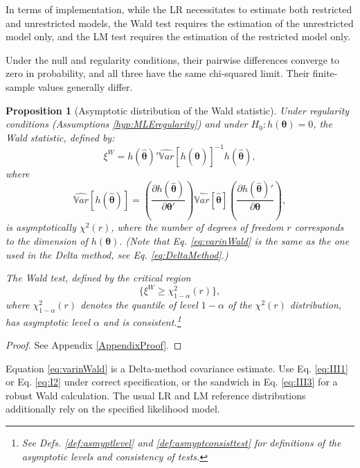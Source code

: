 \documentclass[
  11pt,
]{book}
\newtheorem{proposition}{Proposition}[chapter]
\theoremstyle{definition}
\theoremstyle{definition}
\theoremstyle{definition}
\theoremstyle{definition}
\theoremstyle{remark}
\begin{document}
In terms of implementation, while the LR necessitates to estimate both restricted and unrestricted models, the Wald test requires the estimation of the unrestricted model only, and the LM test requires the estimation of the restricted model only.

Under the null and regularity conditions, their pairwise differences converge to zero in probability, and all three have the same chi-squared limit. Their finite-sample values generally differ.

\begin{proposition}[Asymptotic distribution of the Wald statistic]
\protect\hypertarget{prp:Walddistri}{}\label{prp:Walddistri}Under regularity conditions (Assumptions \ref{hyp:MLEregularity}) and under \(H_0: h(\boldsymbol\theta)=0\), the Wald statistic, defined by:
\[
\boxed{\xi^W = h(\hat{\boldsymbol\theta})' \widehat{\mathbb{V}ar}[h(\hat{\boldsymbol\theta})]^{-1} h(\hat{\boldsymbol\theta}),}
\]
where
\begin{equation}
\widehat{\mathbb{V}ar}[h(\hat{\boldsymbol\theta})] = \left(\frac{\partial h(\hat{\boldsymbol\theta})}{\partial \boldsymbol\theta'} \right) \widehat{\mathbb{V}ar}[\hat{\boldsymbol\theta}]
\left(\frac{\partial h(\hat{\boldsymbol\theta})'}{\partial \boldsymbol\theta} \right),\label{eq:varinWald}
\end{equation}
is asymptotically \(\chi^2(r)\), where the number of degrees of freedom \(r\) corresponds to the dimension of \(h(\boldsymbol\theta)\). (Note that Eq. \eqref{eq:varinWald} is the same as the one used in the Delta method, see Eq. \eqref{eq:DeltaMethod}.)

The Wald test, defined by the critical region
\[
\{\xi^W \ge \chi^2_{1-\alpha}(r)\},
\]
where \(\chi^2_{1-\alpha}(r)\) denotes the quantile of level \(1-\alpha\) of the \(\chi^2(r)\) distribution, has asymptotic level \(\alpha\) and is consistent.\footnote{See Defs. \ref{def:asmyptlevel} and \ref{def:asmyptconsisttest} for definitions of the asymptotic levels and consistency of tests.}
\end{proposition}

\begin{proof}
See Appendix \ref{AppendixProof}.
\end{proof}

Equation \eqref{eq:varinWald} is a Delta-method covariance estimate. Use Eq. \eqref{eq:III1} or Eq. \eqref{eq:I2} under correct specification, or the sandwich in Eq. \eqref{eq:III3} for a robust Wald calculation. The usual LR and LM reference distributions additionally rely on the specified likelihood model.
\end{document}
